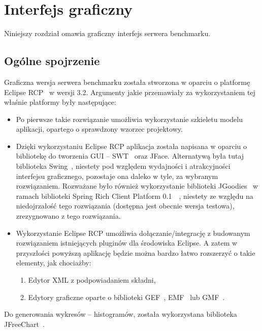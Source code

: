 \chapter{Interfejs graficzny}\label{chap:GUI}
Niniejszy rozdział omawia graficzny interfejs serwera benchmarku.
\section{Ogólne spojrzenie}
Graficzna wersja serwera benchmarku została stworzona w oparciu o platformę 
Eclipse RCP~\cite{RCP1} w wersji 3.2. Argumenty jakie przemawiały za wykorzystaniem tej właśnie platformy
były następujące:
\begin{itemize}
\item Po pierwsze takie rozwiązanie umożliwia wykorzystanie szkieletu modelu aplikacji, 
opartego o sprawdzony wzorzec projektowy.
\item Dzięki wykorzystaniu Eclipse RCP aplikacja została napisana w oparciu o bibliotekę do tworzenia GUI  -- SWT~\cite{SWT1}
oraz JFace. Alternatywą była tutaj biblioteka Swing~\cite{Swing1}, niestety pod względem wydajności i
atrakcyjności interfejsu graficznego, pozostaje ona daleko w tyle, za wybranym rozwiązaniem.
Rozważane było również wykorzystanie biblioteki JGoodies~\cite{JGoodies1} w ramach biblioteki 
Spring Rich Client Platform 0.1~\cite{SpringRCP1}~\cite{SpringRCP2}, niestety ze względu na niedojrzałość 
tego rozwiązania (dostępna jest obecnie wersja testowa), zrezygnowano z tego rozwiązania.
\item Wykorzystanie Eclipse RCP umożliwia dołączanie/integrację z budowanym rozwiązaniem istniejących pluginów
dla środowiska Eclipse. A zatem w przyszłości powyższą aplikację będzie można bardzo łatwo rozszerzyć
o takie elementy, jak chociażby:
\begin{enumerate}
\item Edytor XML z podpowiadaniem składni,
\item Edytory graficzne oparte o biblioteki GEF~\cite{GEF1}, EMF~\cite{EMF1} lub GMF~\cite{GMF1}.
\end{enumerate}
\end{itemize}
Do generowania wykresów -- histogramów, została wykorzystana biblioteka JFreeChart~\cite{JFreeChart1}.


